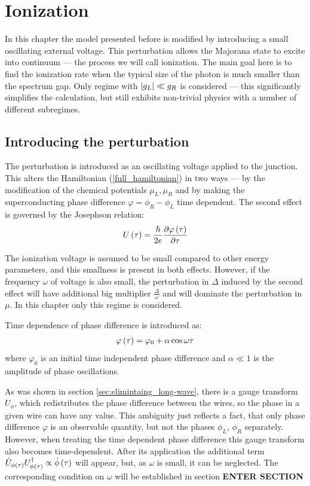 \chapter{Ionization}
\label{chap:ionization}

In this chapter the model presented before is modified by introducing a small oscillating  external voltage. This perturbation allows the Majorana state to excite into continuum --- the process we will call ionization. The main goal here is to find the ionization rate when the typical size of the photon is much smaller than the spectrum gap.  Only regime with $ \left|g_L\right|\ll g_R $ is considered --- this significantly simplifies the calculation, but still exhibits non-trivial physics with a number of different subregimes. 

\section{Introducing the perturbation}

 The perturbation is introduced as an oscillating	 voltage applied to the junction. This alters the Hamiltonian (\ref{full_hamiltonian}) in two ways --- by the modification of the chemical potentials $ \mu_L, \mu_R $ and by making the superconducting phase difference $ \varphi=\phi_R-\phi_L $ time dependent. The second effect is governed by the Josephson relation:
\begin{gather}
	U\left(\tau\right)
	=
	\frac{\hbar}{2e}
	\frac{\partial\varphi\left(\tau\right)}{\partial \tau}
\end{gather}

The ionization voltage is assumed to be small compared to other energy parameters, and this smallness is present in both effects. However, if the frequency $ \omega $ of voltage is also small, the perturbation in $ \Delta $ induced by the second effect will have additional big multiplier $ \frac{\Delta}{\omega} $ and will dominate the perturbation in $ \mu $. In this chapter only this regime is considered.

Time dependence of phase difference is introduced as:
\begin{gather}
	\varphi\left(\tau\right)=\varphi_0+\alpha\cos\omega \tau
\end{gather}
where $ \varphi_0 $ is an initial time independent phase difference and $ \alpha\ll1 $ is the amplitude of phase oscillations.

As was shown in section  \ref{sec:elimintaing_long-wave}, there is a gauge transform $ U_\phi $, which  redistributes the phase difference between the wires, so the phase in a given wire can have any value. This ambiguity just reflects a  fact, that only phase difference $ \varphi $ is an observable quantity, but not the phases $ \phi_L $, $ \phi_R $ separately. However, when treating the time dependent  phase difference this gauge transform also becomes time-dependent. After its application the additional term $ \dot{U}_{\phi\left(\tau\right)}U_{\phi\left(\tau\right)}^\dagger \propto \dot{\phi}\left(\tau\right)$ will appear, but, as $ \omega $ is small, it can be neglected. The corresponding condition on $ \omega $ will be established in section \textbf{ENTER SECTION}  

